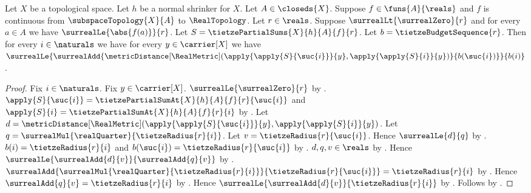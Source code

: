 \begin{theorem}\label{tietze_partial_sums_remaining_budget}
    Let $X$ be a topological space.
    Let $h$ be a normal shrinker for $X$.
    Let $A\in\closeds{X}$.
    Suppose $f\in\funs{A}{\reals}$ and $f$ is continuous from
        $\subspaceTopology{X}{A}$ to $\RealTopology$.
    Let $r\in\reals$.
    Suppose $\surrealLt{\surrealZero}{r}$ and
        for every $a\in A$ we have $\surrealLe{\abs{f(a)}}{r}$.
    Let $S=\tietzePartialSums{X}{h}{A}{f}{r}$.
    Let $b=\tietzeBudgetSequence{r}$.
    Then for every $i\in\naturals$ we have for every
        $y\in\carrier[X]$ we have
        $\surrealLe{
            \surrealAdd{
                \metricDistance[\RealMetric]
                    (\apply{\apply{S}{\suc{i}}}{y},
                     \apply{\apply{S}{i}}{y})}
                {b(\suc{i})}}
            {b(i)}$.
\end{theorem}
\begin{proof}
    Fix $i\in\naturals$.
    Fix $y\in\carrier[X]$.
    $\surrealLe{\surrealZero}{r}$
        by
        .
    $\apply{S}{\suc{i}}
        =\tietzePartialSumAt{X}{h}{A}{f}{r}{\suc{i}}$ and
        $\apply{S}{i}=\tietzePartialSumAt{X}{h}{A}{f}{r}{i}$
        by .
    Let $d=\metricDistance[\RealMetric]
        (\apply{\apply{S}{\suc{i}}}{y},\apply{\apply{S}{i}}{y})$.
    Let $q=\surrealMul{\realQuarter}{\tietzeRadius{r}{i}}$.
    Let $v=\tietzeRadius{r}{\suc{i}}$.
    Hence $\surrealLe{d}{q}$
        by .
    $b(i)=\tietzeRadius{r}{i}$ and
        $b(\suc{i})=\tietzeRadius{r}{\suc{i}}$
        by .
    $d,q,v\in\reals$
        by
        .
    Hence $\surrealLe{\surrealAdd{d}{v}}{\surrealAdd{q}{v}}$
        by .
    $\surrealAdd{
        \surrealMul{\realQuarter}{\tietzeRadius{r}{i}}}
        {\tietzeRadius{r}{\suc{i}}}=\tietzeRadius{r}{i}$
        by .
    Hence $\surrealAdd{q}{v}=\tietzeRadius{r}{i}$ by \auto.
    Hence $\surrealLe{\surrealAdd{d}{v}}{\tietzeRadius{r}{i}}$
        by \auto.
    Follows by \auto.
\end{proof}
